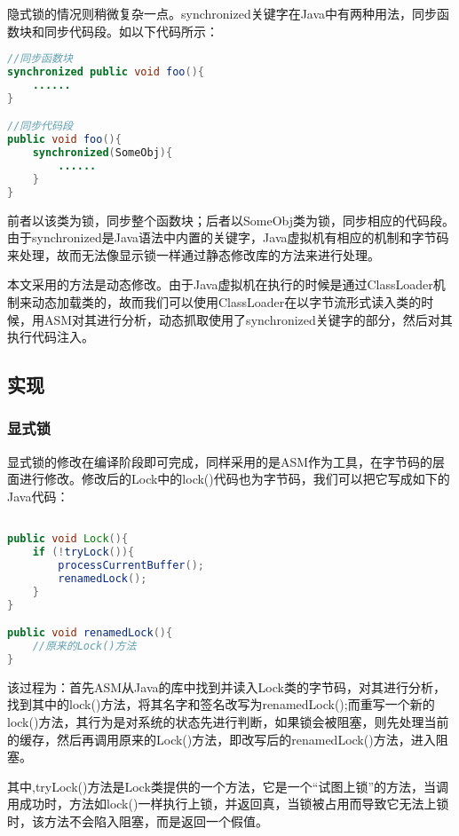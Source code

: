 隐式锁的情况则稍微复杂一点。synchronized关键字在Java中有两种用法，同步函数块和同步代码段。如以下代码所示：

\begin{lstlisting}[language=Java]
//同步函数块
synchronized public void foo(){
	......
}

//同步代码段
public void foo(){
	synchronized(SomeObj){
		......
	}
}
\end{lstlisting}

前者以该类为锁，同步整个函数块；后者以SomeObj类为锁，同步相应的代码段。由于synchronized是Java语法中内置的关键字，Java虚拟机有相应的机制和字节码来处理，故而无法像显示锁一样通过静态修改库的方法来进行处理。

本文采用的方法是动态修改。由于Java虚拟机在执行的时候是通过ClassLoader机制来动态加载类的，故而我们可以使用ClassLoader在以字节流形式读入类的时候，用ASM对其进行分析，动态抓取使用了synchronized关键字的部分，然后对其执行代码注入。

\subsection{实现}

\subsubsection{显式锁}

显式锁的修改在编译阶段即可完成，同样采用的是ASM作为工具，在字节码的层面进行修改。修改后的Lock中的lock()代码也为字节码，我们可以把它写成如下的Java代码：

\begin{lstlisting}[language=Java]

public void Lock(){
	if (!tryLock()){
		processCurrentBuffer();
		renamedLock();
	}
}

public void renamedLock(){
	//原来的Lock()方法
}

\end{lstlisting}

该过程为：首先ASM从Java的库中找到并读入Lock类的字节码，对其进行分析，找到其中的lock()方法，将其名字和签名改写为renamedLock();而重写一个新的lock()方法，其行为是对系统的状态先进行判断，如果锁会被阻塞，则先处理当前的缓存，然后再调用原来的Lock()方法，即改写后的renamedLock()方法，进入阻塞。

其中,tryLock()方法是Lock类提供的一个方法，它是一个“试图上锁”的方法，当调用成功时，方法如lock()一样执行上锁，并返回真，当锁被占用而导致它无法上锁时，该方法不会陷入阻塞，而是返回一个假值。

